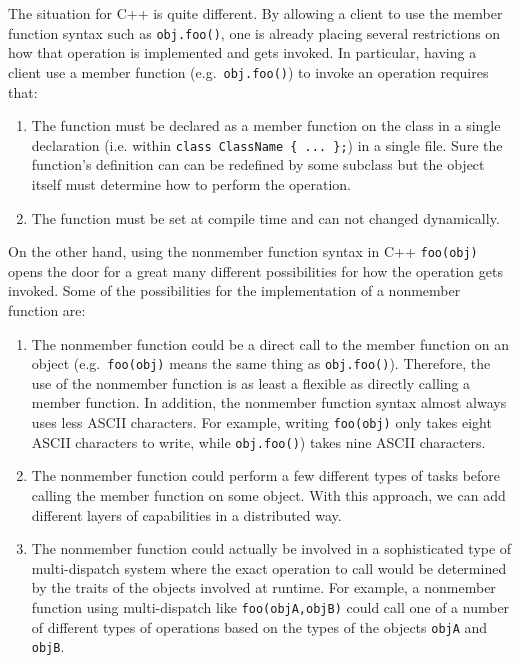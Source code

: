 \documentclass[pdf,ps2pdf,11pt]{SANDreport}
\begin{document}
The situation for C++ is quite different.  By allowing a client to use the
member function syntax such as {}\texttt{obj.foo()}, one is already placing
several restrictions on how that operation is implemented and gets invoked.
In particular, having a client use a member function (e.g.\
{}\texttt{obj.foo()}) to invoke an operation requires that:

\begin{enumerate}

{}\item{}The function must be declared as a member function on the class in a
single declaration (i.e. within {}\texttt{class ClassName \{ ... \};}) in a
single file.  Sure the function's definition can can be redefined by some
subclass but the object itself must determine how to perform the operation.

{}\item{}The function must be set at compile time and can not changed
dynamically.

\end{enumerate}

On the other hand, using the nonmember function syntax in C++
{}\texttt{foo(obj)} opens the door for a great many different possibilities
for how the operation gets invoked.  Some of the possibilities for the
implementation of a nonmember function are:

\begin{enumerate}

{}\item{}The nonmember function could be a direct call to the member function on an
object (e.g.\ {}\texttt{foo(obj)} means the same thing as
{}\texttt{obj.foo()}).  Therefore, the use of the nonmember function is as
least a flexible as directly calling a member function.  In addition, the
nonmember function syntax almost always uses less ASCII characters.  For
example, writing {}\texttt{foo(obj)} only takes eight ASCII characters to
write, while {}\texttt{obj.foo()}) takes nine ASCII characters.

{}\item{}The nonmember function could perform a few different types of tasks
before calling the member function on some object.  With this approach, we can
add different layers of capabilities in a distributed way.

{}\item{}The nonmember function could actually be involved in a sophisticated
type of multi-dispatch system where the exact operation to call would be
determined by the traits of the objects involved at runtime.  For example, a
nonmember function using multi-dispatch like {}\texttt{foo(objA,objB)} could
call one of a number of different types of operations based on the types of
the objects {}\texttt{objA} and {}\texttt{objB}.

\end{enumerate}
\end{document}
